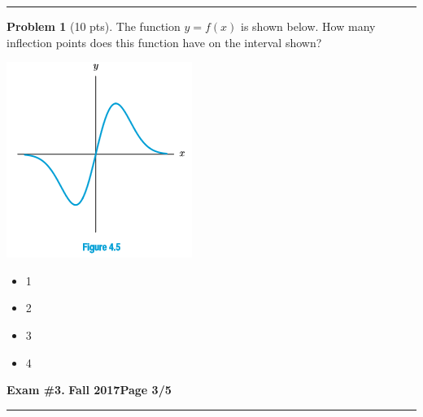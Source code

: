 \documentclass[12pt]{article}
\makeatletter
\theoremstyle{definition}
\newtheorem{problem}{Problem}
\newcommand*{\radiobutton}{%
  \@ifstar{\@radiobutton0}{\@radiobutton1}%
}
\newcommand*{\@radiobutton}[1]{%
  \begin{tikzpicture}
    \pgfmathsetlengthmacro\radius{height("X")/2}
    \draw[radius=\radius] circle;
    \ifcase#1 \fill[radius=.6*\radius] circle;\fi
  \end{tikzpicture}%
}
\makeatother
\begin{document}
\vspace{3cm}
\hrule
\begin{problem}[10 pts]
The function $y=f(x)$ is shown below.  How many inflection points does this function have on the interval shown?
\begin{center}
\includegraphics{3graph1.png}
\end{center}
\begin{itemize}
\item[\radiobutton] 1
\item[\radiobutton] 2
\item[\radiobutton] 3
\item[\radiobutton] 4
\end{itemize}
\end{problem}
\newpage

\hfill{\large\bf Exam \#3.}\hfill{\large\bf
  Fall 2017}\hfill{\large\bf Page 3/5}\hrule
\end{document}
